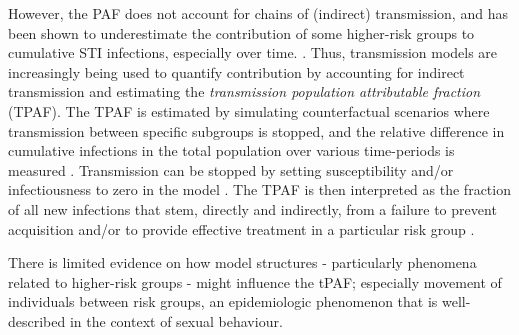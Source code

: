 
However, the PAF does not account for chains of (indirect) transmission, and has been 
shown to underestimate the contribution of some higher-risk groups to cumulative 
STI infections, especially over time. \citep{Mishra2014a}. Thus, 
transmission models are increasingly being used to quantify
contribution by accounting for indirect transmission and estimating   
the \textit{transmission population attributable fraction} (TPAF).
The TPAF is estimated by
simulating counterfactual scenarios where transmission
between specific subgroups is stopped, and
the relative difference in cumulative infections in the total population
over various time-periods is measured \citep{Mishra2016,Mukandavire2018}.  %
Transmission can be stopped by
setting susceptibility and/or infectiousness to zero in the model \citep{Mishra2012}. %
The TPAF is then interpreted as
the fraction of all new infections that stem, directly and indirectly, from
a failure to prevent acquisition and/or to provide effective treatment
in a particular risk group \citep{Mishra2016}.  %
\par
There is limited evidence on how model structures - particularly phenomena 
related to higher-risk groups - might influence the tPAF; %
especially
movement of individuals between risk groups, an epidemiologic phenomenon 
that is well-described in the context of sexual behaviour. %

